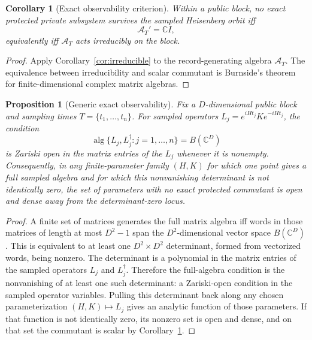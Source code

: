 \documentclass[11pt]{article}
\newtheorem{corollary}{Corollary}
\newtheorem{proposition}{Proposition}
\newcommand{\cA}{\mathcal A}
\begin{document}
\begin{corollary}[Exact observability criterion]
\label{cor:observability}
Within a public block, no exact protected private subsystem survives the
sampled Heisenberg orbit iff
\begin{equation}
  \cA_T'=\mathbb C I,
\end{equation}
equivalently iff $\cA_T$ acts irreducibly on the block.
\end{corollary}

\begin{proof}
Apply Corollary~\ref{cor:irreducible} to the record-generating algebra
$\cA_T$.  The equivalence between irreducibility and scalar commutant is
Burnside's theorem for finite-dimensional complex matrix algebras.
\end{proof}

\begin{proposition}[Generic exact observability]
\label{prop:generic-observability}
Fix a $D$-dimensional public block and sampling times
$T=\{t_1,\ldots,t_n\}$.  For sampled operators
$L_j=e^{iHt_j}Ke^{-iHt_j}$, the condition
\begin{equation}
  \operatorname{alg}\{L_j,L_j^\dagger:j=1,\ldots,n\}
  = B(\mathbb C^D)
\end{equation}
is Zariski open in the matrix entries of the $L_j$ whenever it is
nonempty.  Consequently, in any finite-parameter family $(H,K)$ for
which one point gives a full sampled algebra and for which this
nonvanishing determinant is not identically zero, the set of parameters
with no exact protected commutant is open and dense away from the
determinant-zero locus.
\end{proposition}

\begin{proof}
A finite set of matrices generates the full matrix algebra iff words in
those matrices of length at most $D^2-1$ span the $D^2$-dimensional
vector space $B(\mathbb C^D)$.  This is equivalent to at least one
$D^2\times D^2$ determinant, formed from vectorized words, being
nonzero.  The determinant is a polynomial in the matrix entries of the
sampled operators $L_j$ and $L_j^\dagger$.  Therefore the full-algebra
condition is the nonvanishing of at least one such determinant: a
Zariski-open condition in the sampled operator variables.  Pulling this
determinant back along any chosen parameterization $(H,K)\mapsto L_j$
gives an analytic function of those parameters.  If that function is not
identically zero, its nonzero set is open and dense, and on that set the
commutant is scalar by Corollary~\ref{cor:observability}.
\end{proof}
\end{document}

